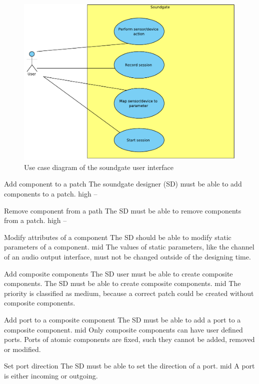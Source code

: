 	\begin{figure}[!h]
		\centering
			\includegraphics[width=\textwidth]{images/User_View.pdf}
		\caption{Use case diagram of the soundgate user interface}
		\label{fig:Soundgate_UserInterface}
	\end{figure}
	

	{Add component to a patch}
	{The soundgate designer (SD) must be able to add components to a patch.}
	{high}
	{--}
	
	{Remove component from a path}
	{The SD must be able to remove components from a patch.}
	{high}
	{--}
	
	{Modify attributes of a component}
	{The SD should be able to modify static parameters of a component.}
	{mid}
	{The values of static parameters, like the channel of an audio output interface, must not be changed outside of the designing time.}
	
	{Add composite components}
	{The SD user must be able to create composite components.}
	{The SD must be able to create composite components.}
	{mid}
	{The priority is classified as medium, because a correct patch could be created without composite components. }
	
	{Add port to a composite component}
	{The SD must be able to add a port to a composite component.}
	{mid}
	{Only composite components can have user defined ports. Ports of atomic components are fixed, such they cannot be added, removed or modified.}
	
	{Set port direction}
	{The SD must be able to set the direction of a port.}
	{mid}
	{A port is either incoming or outgoing.}
	
